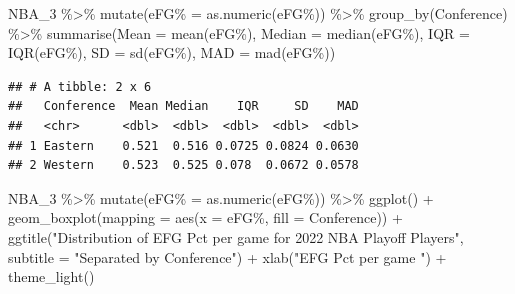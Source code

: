 \documentclass[
]{article}
\newenvironment{Shaded}{\begin{snugshade}}{\end{snugshade}}
\newcommand{\AttributeTok}[1]{\textcolor[rgb]{0.77,0.63,0.00}{#1}}
\newcommand{\FunctionTok}[1]{\textcolor[rgb]{0.00,0.00,0.00}{#1}}
\newcommand{\NormalTok}[1]{#1}
\newcommand{\OtherTok}[1]{\textcolor[rgb]{0.56,0.35,0.01}{#1}}
\newcommand{\SpecialCharTok}[1]{\textcolor[rgb]{0.00,0.00,0.00}{#1}}
\newcommand{\StringTok}[1]{\textcolor[rgb]{0.31,0.60,0.02}{#1}}
\begin{document}
\begin{Shaded}
\begin{Highlighting}[]
\NormalTok{NBA\_3 }\SpecialCharTok{\%\textgreater{}\%} \FunctionTok{mutate}\NormalTok{(}\StringTok{\textasciigrave{}}\AttributeTok{eFG\%}\StringTok{\textasciigrave{}} \OtherTok{=} \FunctionTok{as.numeric}\NormalTok{(}\StringTok{\textasciigrave{}}\AttributeTok{eFG\%}\StringTok{\textasciigrave{}}\NormalTok{)) }\SpecialCharTok{\%\textgreater{}\%}  \FunctionTok{group\_by}\NormalTok{(Conference) }\SpecialCharTok{\%\textgreater{}\%} 
  \FunctionTok{summarise}\NormalTok{(}\AttributeTok{Mean =} \FunctionTok{mean}\NormalTok{(}\StringTok{\textasciigrave{}}\AttributeTok{eFG\%}\StringTok{\textasciigrave{}}\NormalTok{), }\AttributeTok{Median =} \FunctionTok{median}\NormalTok{(}\StringTok{\textasciigrave{}}\AttributeTok{eFG\%}\StringTok{\textasciigrave{}}\NormalTok{),}
            \AttributeTok{IQR =} \FunctionTok{IQR}\NormalTok{(}\StringTok{\textasciigrave{}}\AttributeTok{eFG\%}\StringTok{\textasciigrave{}}\NormalTok{), }\AttributeTok{SD =} \FunctionTok{sd}\NormalTok{(}\StringTok{\textasciigrave{}}\AttributeTok{eFG\%}\StringTok{\textasciigrave{}}\NormalTok{), }\AttributeTok{MAD =} \FunctionTok{mad}\NormalTok{(}\StringTok{\textasciigrave{}}\AttributeTok{eFG\%}\StringTok{\textasciigrave{}}\NormalTok{))}
\end{Highlighting}
\end{Shaded}

\begin{verbatim}
## # A tibble: 2 x 6
##   Conference  Mean Median    IQR     SD    MAD
##   <chr>      <dbl>  <dbl>  <dbl>  <dbl>  <dbl>
## 1 Eastern    0.521  0.516 0.0725 0.0824 0.0630
## 2 Western    0.523  0.525 0.078  0.0672 0.0578
\end{verbatim}

\begin{Shaded}
\begin{Highlighting}[]
\NormalTok{NBA\_3 }\SpecialCharTok{\%\textgreater{}\%} \FunctionTok{mutate}\NormalTok{(}\StringTok{\textasciigrave{}}\AttributeTok{eFG\%}\StringTok{\textasciigrave{}} \OtherTok{=} \FunctionTok{as.numeric}\NormalTok{(}\StringTok{\textasciigrave{}}\AttributeTok{eFG\%}\StringTok{\textasciigrave{}}\NormalTok{)) }\SpecialCharTok{\%\textgreater{}\%} 
  \FunctionTok{ggplot}\NormalTok{() }\SpecialCharTok{+} \FunctionTok{geom\_boxplot}\NormalTok{(}\AttributeTok{mapping =} \FunctionTok{aes}\NormalTok{(}\AttributeTok{x =} \StringTok{\textasciigrave{}}\AttributeTok{eFG\%}\StringTok{\textasciigrave{}}\NormalTok{, }\AttributeTok{fill =}\NormalTok{ Conference)) }\SpecialCharTok{+}
  \FunctionTok{ggtitle}\NormalTok{(}\StringTok{"Distribution of EFG Pct per game for 2022 NBA Playoff Players"}\NormalTok{,}
          \AttributeTok{subtitle =} \StringTok{"Separated by Conference"}\NormalTok{) }\SpecialCharTok{+} \FunctionTok{xlab}\NormalTok{(}\StringTok{"EFG Pct per game "}\NormalTok{) }\SpecialCharTok{+} \FunctionTok{theme\_light}\NormalTok{()}
\end{Highlighting}
\end{Shaded}
\end{document}

